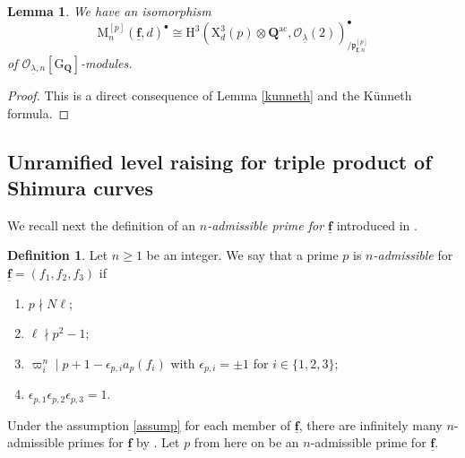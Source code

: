 \documentclass[10pt]{amsart}
\numberwithin{equation}{section}
\theoremstyle{plain}
\newtheorem{lemma}[theorem]{Lemma}
\numberwithin{equation}{section}
\theoremstyle{definition}
\newtheorem{definition}[theorem]{Definition}
\theoremstyle{remark}
\def\ac{\mathrm{ac}}
\def\ac{\mathrm{ac}}
\def\undlamb{\underline{\lambda}}
\def\triplef{\underline{\mathbf{f}}}
\def\calO{\mathcal{O}}
\def\frakp{\mathfrak{p}}
\def\QQ{\mathbf{Q}}
\def\rmG{\mathrm{G}}
\def\rmH{\mathrm{H}}
\def\rmM{\mathrm{M}}
\def\rmX{\mathrm{X}}
\begin{document}
\begin{lemma}\label{new-part-threefold}
We have an isomorphism
\begin{equation*}
\rmM^{[p]}_{n}(\triplef, d)^{\bullet}\cong \rmH^{3}(\rmX^{3}_{d}(p)\otimes\QQ^{\ac}, \calO_{\undlamb}(2))^{\bullet}_{/\frakp^{[p]}_{\triplef,n}}
\end{equation*}
of $\calO_{\undlamb,n}[\rmG_{\QQ}]$-modules.
\end{lemma}
\begin{proof}
This is a direct consequence of Lemma \ref{kunneth} and the K\"unneth formula.
\end{proof}

\subsection{Unramified level raising for triple product of Shimura curves}\label{unram-raise} We recall next the definition of an \emph{$n$-admissible prime for $\triplef$} introduced in \cite[Definition 4.3]{Wang}. 
\begin{definition}
Let $n\geq 1$ be an integer. We say that a prime $p$ is \emph{$n$-admissible} for $\triplef=(f_{1}, f_{2}, f_{3})$ if 
\begin{enumerate}
\item $p\nmid N\ell$;
\item $\ell\nmid p^{2}-1$;
\item $\varpi_{i}^{n}\mid p+1-\epsilon_{p, i}a_{p}(f_{i})$ with $\epsilon_{p,i}=\pm1$ for $i\in\{1, 2, 3\}$;
\item $\epsilon_{p, 1}\epsilon_{p, 2}\epsilon_{p, 3}=1$. 
\end{enumerate}
\end{definition} 
Under the assumption \ref{assump} for each member of $\triplef$, there are infinitely many $n$-admissible primes for $\triplef$ by \cite[Lemma 5.5]{Wang}. Let $p$ from here on be an $n$-admissible prime for $\triplef$.
\end{document}
